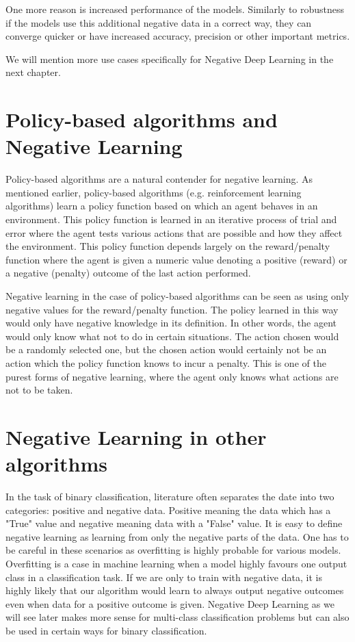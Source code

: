 \documentclass[b5paper]{book}
\begin{document}
One more reason is increased performance of the models. Similarly to robustness if the models use this additional negative data in a correct way, they can converge quicker or have increased accuracy, precision or other important metrics.

We will mention more use cases specifically for Negative Deep Learning in the next chapter.

\section{Policy-based algorithms and Negative Learning}

Policy-based algorithms are a natural contender for negative learning. As mentioned earlier, policy-based algorithms (e.g. reinforcement learning algorithms) learn a policy function based on which an agent behaves in an environment. This policy function is learned in an iterative process of trial and error where the agent tests various actions that are possible and how they affect the environment. This policy function depends largely on the reward/penalty function where the agent is given a numeric value denoting a positive (reward) or a negative (penalty) outcome of the last action performed.

Negative learning in the case of policy-based algorithms can be seen as using only negative values for the reward/penalty function. The policy learned in this way would only have negative knowledge in its definition. In other words, the agent would only know what not to do in certain situations. The action chosen would be a randomly selected one, but the chosen action would certainly not be an action which the policy function knows to incur a penalty. This is one of the purest forms of negative learning, where the agent only knows what actions are not to be taken.

\section{Negative Learning in other algorithms}

In the task of binary classification, literature often separates the date into two categories: positive and negative data. Positive meaning the data which has a "True" value and negative meaning data with a "False" value. It is easy to define negative learning as learning from only the negative parts of the data. One has to be careful in these scenarios as overfitting is highly probable for various models. Overfitting is a case in machine learning when a model highly favours one output class in a classification task. If we are only to train with negative data, it is highly likely that our algorithm would learn to always output negative outcomes even when data for a positive outcome is given. Negative Deep Learning as we will see later makes more sense for multi-class classification problems but can also be used in certain ways for binary classification.
\end{document}
